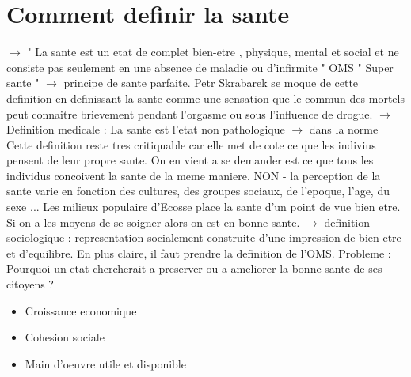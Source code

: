 \documentclass{article}
\begin{document}
\section{Comment definir la sante}
$\rightarrow $ " La sante est un etat de complet bien-etre , physique, mental et social et ne consiste pas seulement en une absence de maladie ou d'infirmite " OMS
\newline\newline
" Super sante " $ \rightarrow $ principe de sante parfaite.
\newline\newline
Petr Skrabarek se moque de cette definition en definissant la sante comme une sensation que le commun des mortels peut connaitre brievement pendant l'orgasme ou sous l'influence de drogue.
\newline\newline
$\rightarrow$ Definition medicale : La sante est l'etat non pathologique $\rightarrow$ dans la norme
Cette definition reste tres critiquable car elle met de cote ce que les indivius pensent de leur propre sante.
\newline\newline
On en vient a se demander est ce que tous les individus concoivent la sante de la meme maniere.
\newline\newline
NON - la perception de la sante varie en fonction des cultures, des groupes sociaux, de l'epoque, l'age, du sexe ...
\newline\newline
Les milieux populaire d'Ecosse place la sante d'un point de vue bien etre. Si on a les moyens de se soigner alors on est en bonne sante.
\newline\newline
$\rightarrow$ definition sociologique : representation socialement construite d'une impression de bien etre et d'equilibre.
\newline\newline\newline
En plus claire, il faut prendre la definition de l'OMS.
\newline\newline
Probleme : Pourquoi un etat chercherait a preserver ou a ameliorer la bonne sante de ses citoyens ?
\newline\newline
\begin{itemize}[label=\textbullet]
	\item Croissance economique
	\item Cohesion sociale
	\item Main d'oeuvre utile et disponible
\end{itemize}
\end{document}
